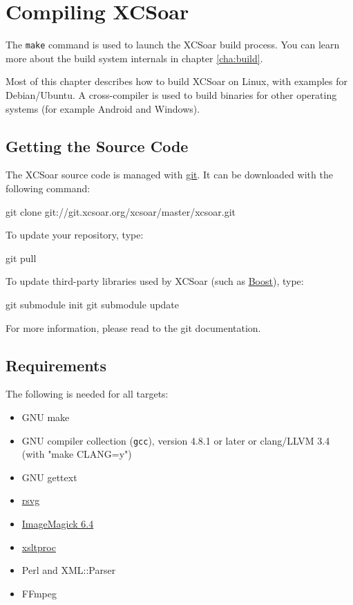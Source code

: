 \chapter{Compiling XCSoar}\label{cha:compiling}

The \texttt{make} command is used to launch the XCSoar build process.
You can learn more about the build system internals in chapter
\ref{cha:build}.

Most of this chapter describes how to build XCSoar on Linux, with
examples for Debian/Ubuntu.  A cross-compiler is used to build
binaries for other operating systems (for example Android and
Windows).

\section{Getting the Source Code}

The XCSoar source code is managed with
\href{http://git-scm.com/}{git}.  It can be downloaded with the
following command:

\begin{verbatim*}
git clone git://git.xcsoar.org/xcsoar/master/xcsoar.git
\end{verbatim*}

To update your repository, type:

\begin{verbatim*}
git pull
\end{verbatim*}

To update third-party libraries used by XCSoar (such as
\href{http://www.boost.org/}{Boost}), type:

\begin{verbatim*}
git submodule init
git submodule update
\end{verbatim*}

For more information, please read to the git documentation.

\section{Requirements}

The following is needed for all targets:

\begin{itemize}
\item GNU make
\item GNU compiler collection (\texttt{gcc}), version 4.8.1 or later
  or clang/LLVM 3.4 (with "make CLANG=y")
\item GNU gettext
\item \href{http://librsvg.sourceforge.net/)}{rsvg}
\item \href{http://www.imagemagick.org/}{ImageMagick 6.4}
\item \href{http://xmlsoft.org/XSLT/xsltproc2.html}{xsltproc}
\item Perl and XML::Parser
\item FFmpeg
\end{itemize}

